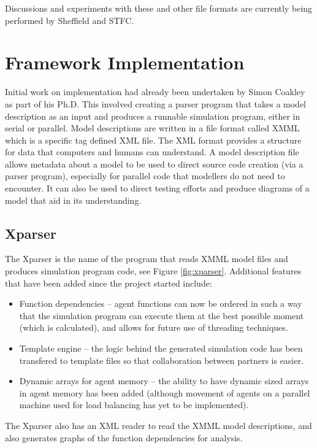 \documentclass[a4paper,11pt]{article}
\begin{document}
Discussions and experiments with these and other file formats are currently being performed by Sheffield and STFC.

\pagebreak

\section{Framework Implementation}

Initial work on implementation had already been undertaken by Simon Coakley as part of his Ph.D.
This involved creating a parser program that takes a model description as an input and produces a runnable simulation program, either in serial or parallel. Model descriptions are written in a file format called XMML which is a specific tag defined XML file. The XML format provides a structure for data that computers and humans can understand. A model description file allows metadata about a model to be used to direct source code creation (via a parser program), especially for parallel code that modellers do not need to encounter. It can also be used to direct testing efforts and produce diagrams of a model that aid in its understanding.

\subsection{Xparser}
The Xparser is the name of the program that reads XMML model files
and produces simulation program code, see Figure \ref{fig:xparser}.
Additional features that have been added since the project started include:

\begin{itemize}
\item Function dependencies -- agent functions can now be ordered in such a way that the simulation program can execute them at the best possible moment (which is calculated), and allows for future use of threading techniques.
\item Template engine -- the logic behind the generated simulation code has been transfered to template files so that collaboration between partners is easier.
\item Dynamic arrays for agent memory -- the ability to have dynamic sized arrays in agent memory has been added (although movement of agents on a parallel machine used for load balancing has yet to be implemented).
\end{itemize}

The Xparser also has an XML reader to read the XMML model descriptions, and also generates graphs of the function dependencies for analysis.
\end{document}
